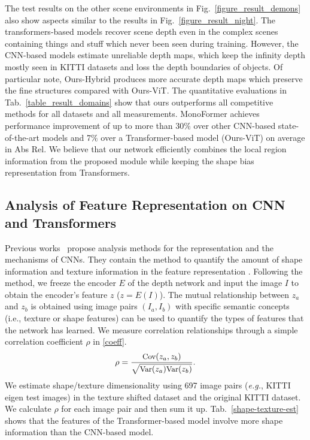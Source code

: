 \documentclass[letterpaper]{article} \usepackage{aaai23}  \usepackage{times}  \usepackage{helvet}  \usepackage{courier}  \usepackage[hyphens]{url}  \usepackage{graphicx} \urlstyle{rm} \def\UrlFont{\rm}  \usepackage{natbib}  \usepackage{caption} \frenchspacing  \setlength{\pdfpagewidth}{8.5in} \setlength{\pdfpageheight}{11in} \usepackage{algorithm}
\newcommand{\tabref}[1]{Tab.~\ref{#1}}
\newcommand{\figref}[1]{Fig.~\ref{#1}}
\begin{document}
The test results on the other scene environments in \figref{figure_result_demons} also show aspects similar to the results in \figref{figure_result_night}.
The transformers-based models recover scene depth even in the complex scenes containing things and stuff which never been seen during training. However, the CNN-based models estimate unreliable depth maps, which keep the infinity depth mostly seen in KITTI datasets and loss the depth boundaries of objects. 
Of particular note, Ours-Hybrid produces more accurate depth maps which preserve the fine structures compared with Ours-ViT. The quantitative evaluations in \tabref{table_result_domains} show that ours outperforms all competitive methods for all datasets and all measurements. 
MonoFormer achieves performance improvement of up to more than 30$\%$ over other CNN-based state-of-the-art models and 7$\%$ over a Transformer-based model (Ours-ViT) on average in Abs Rel.
We believe that our network efficiently combines the local region information from the proposed module while keeping the shape bias representation from Transformers.

\subsection{Analysis of Feature Representation on CNN and Transformers}

Previous works~\cite{geirhos2018imagenet,esser2020disentangling,islam2021shape} propose analysis methods for the representation and the mechanisms of CNNs. They contain the method to quantify the amount of shape information and texture information in the feature representation \cite{islam2021shape}. 
Following the method, we freeze the encoder $E$ of the depth network and input the image $I$ to obtain the encoder's feature $z$ ($z = E(I)$). The mutual relationship between $z_a$ and $z_b$ is obtained using image pairs $(I_a,I_b)$ with specific semantic concepts (i.e., texture or shape features) can be used to quantify the types of features that the network has learned. We measure correlation relationships through a simple correlation coefficient $\rho$ in \eqref{coeff}.
\begin{equation}
\small
    \rho = \frac{\text{Cov}(z_a,z_b)}{\sqrt{\text{Var}(z_a)\text{Var}(z_b)}}.
\label{coeff}
\end{equation}
We estimate shape/texture dimensionality using 697 image pairs (\textit{e.g.}, KITTI eigen test images) in the texture shifted dataset and the original KITTI dataset. We calculate $\rho$ for each image pair and then sum it up. \tabref{shape-texture-est} shows that the features of the Transformer-based model involve more shape information than the CNN-based model.
\end{document}
